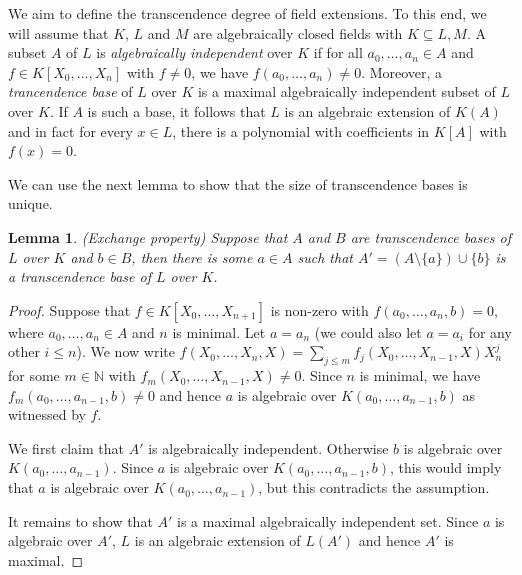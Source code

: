 \documentclass[10pt]{amsart}
\newcommand{\FF}{\mathbb{F}}
\newcommand{\NNN}{\mathbb{N}}
\newtheorem{lemma}[theorem]{Lemma}
\theoremstyle{definition}
\theoremstyle{remark}
\begin{document}
%

We aim to define the transcendence degree of field extensions. To this end, we will assume that $K$, $L$ and $M$ are algebraically closed fields with $K\subseteq L, M$. A subset $A$ of $L$ is \emph{algebraically independent} over $K$ if for all $a_0,\dots,a_n\in A$ and $f\in K[X_0,\dots,X_n]$ with $f\neq 0$, we have $f(a_0,\dots,a_n)\neq 0$. Moreover, a \emph{trancendence base} of $L$ over $K$ is a maximal algebraically independent subset of $L$ over $K$. If $A$ is such a base, it follows that $L$ is an algebraic extension of $K(A)$ and in fact for every $x\in L$, there is a polynomial with coefficients in $K[A]$ with $f(x)=0$. 

We can use the next lemma to show that the size of transcendence bases is unique. 

\begin{lemma} (Exchange property) 
Suppose that $A$ and $B$ are transcendence bases of $L$ over $K$ and $b\in B$, then there is some $a\in A$ such that $A'=(A\setminus \{a\})\cup \{b\}$ is a transcendence base of $L$ over $K$. 
\end{lemma} 
\begin{proof} 
Suppose that $f\in K[X_0,\dots,X_{n+1}]$ is non-zero with $f(a_0,\dots,a_n,b)=0$, where $a_0,\dots,a_n\in A$ and $n$ is minimal. Let $a=a_n$ (we could also let $a=a_i$ for any other $i\leq n$). We now write $f(X_0,\dots,X_n,X)=\sum_{j\leq m} f_j(X_0,\dots,
X_{n-1},X) X_n^j$ for some $m\in\NNN$ with $f_m(X_0,\dots,X_{n-1},X)\neq0$. Since $n$ is minimal, we have $f_m(a_0,\dots,a_{n-1},b)\neq 0$ and hence $a$ is algebraic over $K(a_0,\dots,a_{n-1},b)$ as witnessed by $f$. 

We first claim that $A'$ is algebraically independent. Otherwise $b$ is algebraic over $K(a_0,\dots,a_{n-1})$. Since $a$ is algebraic over $K(a_0,\dots,a_{n-1},b)$, this would imply that $a$ is algebraic over $K(a_0,\dots,a_{n-1})$, but this contradicts the assumption. 

It remains to show that $A'$ is a maximal algebraically independent set. Since $a$ is algebraic over $A'$, $L$ is an algebraic extension of $L(A')$ and hence $A'$ is maximal. 
\end{proof} 
\end{document}
